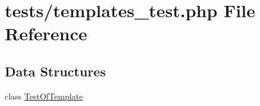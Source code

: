 \hypertarget{templates__test_8php}{\section{tests/templates\-\_\-test.php File Reference}
\label{templates__test_8php}
}
\subsection*{Data Structures}
\begin{DoxyCompactItemize}
\item 
class \hyperlink{class_test_of_template}{Test\-Of\-Template}
\end{DoxyCompactItemize}

